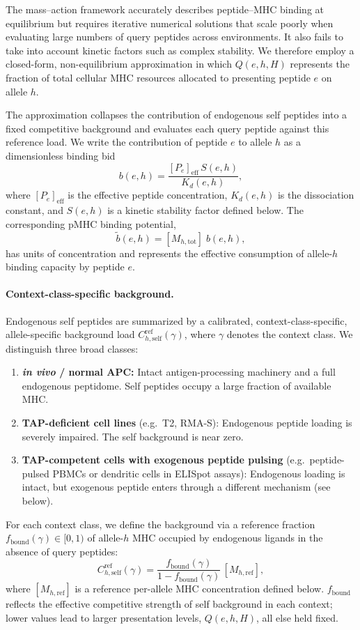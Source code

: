\documentclass[11pt]{article}
\begin{document}
The mass--action framework accurately describes peptide--MHC binding at equilibrium but requires iterative numerical solutions that scale poorly when evaluating large numbers of query peptides across environments. It also fails to take into account kinetic factors such as complex stability. We therefore employ a closed-form, non-equilibrium approximation in which \(Q(e,h,H)\) represents the fraction of total cellular MHC resources allocated to presenting peptide \(e\) on allele \(h\).

The approximation collapses the contribution of endogenous self peptides into a fixed competitive background and evaluates each query peptide against this reference load. We write the contribution of peptide \(e\) to allele \(h\) as a dimensionless binding bid
\[
b(e,h)
=
\frac{[P_e]_{\mathrm{eff}}\,S(e,h)}{K_d(e,h)},
\]
where \([P_e]_{\mathrm{eff}}\) is the effective peptide concentration, \(K_d(e,h)\) is the dissociation constant, and \(S(e,h)\) is a kinetic stability factor defined below. The corresponding pMHC binding potential,
\[
\widetilde b(e,h)
=
[M_{h,\mathrm{tot}}]\;b(e,h),
\]
has units of concentration and represents the effective consumption of allele-\(h\) binding capacity by peptide \(e\).

\paragraph{Context-class-specific background.}
Endogenous self peptides are summarized by a calibrated, context-class-specific, allele-specific background load \(C^{\mathrm{ref}}_{h,\mathrm{self}}(\gamma)\), where \(\gamma\) denotes the context class. We distinguish three broad classes:
\begin{enumerate}[label=(\roman*),nosep]
  \item \textbf{\textit{in vivo} / normal APC:} Intact antigen-processing machinery and a full endogenous peptidome. Self peptides occupy a large fraction of available MHC.
  \item \textbf{TAP-deficient cell lines} (e.g.\ T2, RMA-S): Endogenous peptide loading is severely impaired. The self background is near zero.
  \item \textbf{TAP-competent cells with exogenous peptide pulsing} (e.g.\ peptide-pulsed PBMCs or dendritic cells in ELISpot assays): Endogenous loading is intact, but exogenous peptide enters through a different mechanism (see below).
\end{enumerate}

For each context class, we define the background via a reference fraction \(f_{\mathrm{bound}}(\gamma)\in[0,1)\) of allele-\(h\) MHC occupied by endogenous ligands in the absence of query peptides:
\[
C^{\mathrm{ref}}_{h,\mathrm{self}}(\gamma)
=
\frac{f_{\mathrm{bound}}(\gamma)}{1-f_{\mathrm{bound}}(\gamma)}\,[M_{h,\mathrm{ref}}],
\]
where \([M_{h,\mathrm{ref}}]\) is a reference per-allele MHC concentration defined below. \(f_{\mathrm{bound}}\) reflects the effective competitive strength of self background in each context; lower values lead to larger presentation levels, \(Q(e,h,H)\), all else held fixed. 
\end{document}
